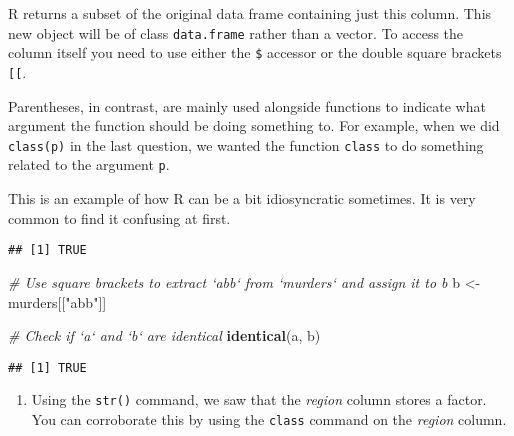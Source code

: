 \documentclass[]{article}
\newenvironment{Shaded}{\begin{snugshade}}{\end{snugshade}}
\newcommand{\CommentTok}[1]{\textcolor[rgb]{0.56,0.35,0.01}{\textit{#1}}}
\newcommand{\KeywordTok}[1]{\textcolor[rgb]{0.13,0.29,0.53}{\textbf{#1}}}
\newcommand{\NormalTok}[1]{#1}
\newcommand{\OperatorTok}[1]{\textcolor[rgb]{0.81,0.36,0.00}{\textbf{#1}}}
\newcommand{\StringTok}[1]{\textcolor[rgb]{0.31,0.60,0.02}{#1}}
\providecommand{\tightlist}{%
  \setlength{\itemsep}{0pt}\setlength{\parskip}{0pt}}
\begin{document}
R returns a subset of the original data frame containing just this
column. This new object will be of class \texttt{data.frame} rather than
a vector. To access the column itself you need to use either the
\texttt{\$} accessor or the double square brackets \texttt{{[}{[}}.

Parentheses, in contrast, are mainly used alongside functions to
indicate what argument the function should be doing something to. For
example, when we did \texttt{class(p)} in the last question, we wanted
the function \texttt{class} to do something related to the argument
\texttt{p}.

This is an example of how R can be a bit idiosyncratic sometimes. It is
very common to find it confusing at first.

\begin{Shaded}
\end{Shaded}

\begin{verbatim}
## [1] TRUE
\end{verbatim}

\begin{Shaded}
\begin{Highlighting}[]
\CommentTok{# Use square brackets to extract `abb` from `murders` and assign it to b}
\NormalTok{b <-}\StringTok{ }\NormalTok{murders[[}\StringTok{"abb"}\NormalTok{]]}

\CommentTok{# Check if `a` and `b` are identical }
\KeywordTok{identical}\NormalTok{(a, b)}
\end{Highlighting}
\end{Shaded}

\begin{verbatim}
## [1] TRUE
\end{verbatim}

\begin{enumerate}
\def\labelenumi{\arabic{enumi}.}
\setcounter{enumi}{4}
\tightlist
\item
  Using the \texttt{str()} command, we saw that the \emph{region} column
  stores a factor. You can corroborate this by using the \texttt{class}
  command on the \emph{region} column.
\end{enumerate}
\end{document}

